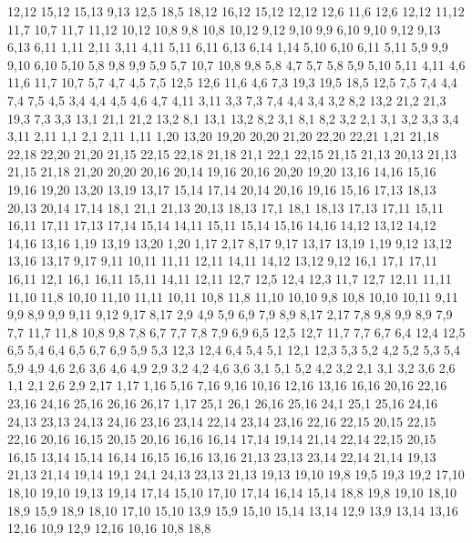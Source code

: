 12,12
15,12
15,13
9,13
%
12,5
18,5
18,12
16,12
15,12
12,12
12,6
%
11,6
12,6
12,12
11,12
11,7
%
10,7
11,7
11,12
10,12
10,8
%
9,8
10,8
10,12
9,12
9,10
9,9
%
6,10
9,10
9,12
9,13
6,13
6,11
%
1,11
2,11
3,11
4,11
5,11
6,11
6,13
6,14
1,14
%
5,10
6,10
6,11
5,11
%
5,9
9,9
9,10
6,10
5,10
%
5,8
9,8
9,9
5,9
%
5,7
10,7
10,8
9,8
5,8
%
4,7
5,7
5,8
5,9
5,10
5,11
4,11
%
4,6
11,6
11,7
10,7
5,7
4,7
%
4,5
7,5
12,5
12,6
11,6
4,6
%
7,3
19,3
19,5
18,5
12,5
7,5
7,4
%
4,4
7,4
7,5
4,5
%
3,4
4,4
4,5
4,6
4,7
4,11
3,11
%
3,3
7,3
7,4
4,4
3,4
%
3,2
8,2
13,2
21,2
21,3
19,3
7,3
3,3
%
13,1
21,1
21,2
13,2
%
8,1
13,1
13,2
8,2
%
3,1
8,1
8,2
3,2
%
2,1
3,1
3,2
3,3
3,4
3,11
2,11
%
1,1
2,1
2,11
1,11
1,20
13,20
19,20
20,20
21,20
22,20
22,21
1,21
%
21,18
22,18
22,20
21,20
%
21,15
22,15
22,18
21,18
%
21,1
22,1
22,15
21,15
21,13
%
20,13
21,13
21,15
21,18
21,20
20,20
20,16
20,14
%
19,16
20,16
20,20
19,20
%
13,16
14,16
15,16
19,16
19,20
13,20
13,19
13,17
%
15,14
17,14
20,14
20,16
19,16
15,16
%
17,13
18,13
20,13
20,14
17,14
%
18,1
21,1
21,13
20,13
18,13
%
17,1
18,1
18,13
17,13
17,11
%
15,11
16,11
17,11
17,13
17,14
15,14
%
14,11
15,11
15,14
15,16
14,16
14,12
%
13,12
14,12
14,16
13,16
%
1,19
13,19
13,20
1,20
%
1,17
2,17
8,17
9,17
13,17
13,19
1,19
%
9,12
13,12
13,16
13,17
9,17
%
9,11
10,11
11,11
12,11
14,11
14,12
13,12
9,12
%
16,1
17,1
17,11
16,11
%
12,1
16,1
16,11
15,11
14,11
12,11
12,7
12,5
12,4
12,3
%
11,7
12,7
12,11
11,11
11,10
11,8
%
10,10
11,10
11,11
10,11
%
10,8
11,8
11,10
10,10
%
9,8
10,8
10,10
10,11
9,11
9,9
%
8,9
9,9
9,11
9,12
9,17
8,17
%
2,9
4,9
5,9
6,9
7,9
8,9
8,17
2,17
%
7,8
9,8
9,9
8,9
7,9
%
7,7
11,7
11,8
10,8
9,8
7,8
%
6,7
7,7
7,8
7,9
6,9
%
6,5
12,5
12,7
11,7
7,7
6,7
%
6,4
12,4
12,5
6,5
%
5,4
6,4
6,5
6,7
6,9
5,9
%
5,3
12,3
12,4
6,4
5,4
%
5,1
12,1
12,3
5,3
5,2
%
4,2
5,2
5,3
5,4
5,9
4,9
4,6
%
2,6
3,6
4,6
4,9
2,9
%
3,2
4,2
4,6
3,6
%
3,1
5,1
5,2
4,2
3,2
%
2,1
3,1
3,2
3,6
2,6
%
1,1
2,1
2,6
2,9
2,17
1,17
1,16
5,16
7,16
9,16
10,16
12,16
13,16
16,16
20,16
22,16
23,16
24,16
25,16
26,16
26,17
1,17
%
25,1
26,1
26,16
25,16
%
24,1
25,1
25,16
24,16
24,13
%
23,13
24,13
24,16
23,16
23,14
%
22,14
23,14
23,16
22,16
22,15
%
20,15
22,15
22,16
20,16
%
16,15
20,15
20,16
16,16
%
16,14
17,14
19,14
21,14
22,14
22,15
20,15
16,15
%
13,14
15,14
16,14
16,15
16,16
13,16
%
21,13
23,13
23,14
22,14
21,14
%
19,13
21,13
21,14
19,14
%
19,1
24,1
24,13
23,13
21,13
19,13
19,10
19,8
19,5
19,3
19,2
%
17,10
18,10
19,10
19,13
19,14
17,14
%
15,10
17,10
17,14
16,14
15,14
%
18,8
19,8
19,10
18,10
18,9
%
15,9
18,9
18,10
17,10
15,10
%
13,9
15,9
15,10
15,14
13,14
%
12,9
13,9
13,14
13,16
12,16
%
10,9
12,9
12,16
10,16
%
10,8
18,8
